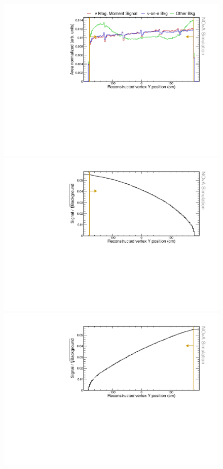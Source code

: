\begin{figure}[hbtp]
\centering
\includegraphics[width=.9\textwidth]{Plots/NuMMEventSelection/N1Cut_vtxYActive.pdf}
\includegraphics[width=.9\textwidth]{Plots/NuMMEventSelection/NuMM_N1Cut_vtxYActiveright_FOMStats.pdf}
\includegraphics[width=.9\textwidth]{Plots/NuMMEventSelection/NuMM_N1Cut_vtxYActiveleft_FOMStats.pdf}

\end{figure}
